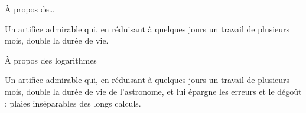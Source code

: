 \begin{frame}{À propos de\ldots}
\begin{coolquote}
Un artifice admirable qui, en réduisant à quelques jours un travail de plusieurs mois, double la durée de vie.
\end{coolquote}
\end{frame}
\begin{frame}{À propos des logarithmes}
\begin{coolquote}
Un artifice admirable qui, en réduisant à quelques jours un travail de plusieurs mois, double la durée de vie de l'astronome, et lui épargne les erreurs et le dégoût : plaies inséparables des longs calculs.
\end{coolquote}
\end{frame}
